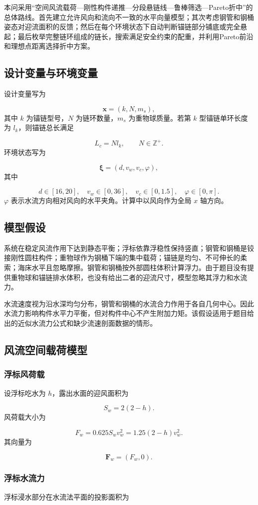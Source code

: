 \documentclass[UTF8,zihao=-4,a4paper,fontset=fandol]{ctexart}
\begin{document}
本问采用“空间风流载荷—刚性构件递推—分段悬链线—鲁棒筛选—Pareto折中”的总体路线。首先建立允许风向和流向不一致的水平向量模型；其次考虑钢管和钢桶姿态对迎流面积的反馈；然后在每个环境状态下自动判断锚链部分铺底或完全悬起；最后枚举完整链环组成的链长，搜索满足安全约束的配重，并利用Pareto前沿和理想点距离选择折中方案。

\subsection{设计变量与环境变量}
设计变量写为

\[
\boldsymbol x=(k,N,m_s),
\]
其中 \(k\) 为锚链型号，\(N\) 为链环数量，\(m_s\) 为重物球质量。若第 \(k\) 型锚链单环长度为 \(l_k\)，则锚链总长满足

\[
L_c=Nl_k,\qquad N\in\mathbb Z^+.
\]
环境状态写为

\[
\boldsymbol\xi=(d,v_w,v_c,\varphi),
\]
其中

\[
d\in[16,20],\quad
v_w\in[0,36],\quad
v_c\in[0,1.5],\quad
\varphi\in[0,\pi].
\]
\(\varphi\) 表示水流方向相对风向的水平夹角。计算中以风向作为全局 \(x\) 轴方向。

\subsection{模型假设}
系统在稳定风流作用下达到静态平衡；浮标依靠浮稳性保持竖直；钢管和钢桶是铰接刚性圆柱构件；重物球作为钢桶下端的集中载荷；锚链是均匀、不可伸长的柔索；海床水平且忽略摩擦。钢管和钢桶按外部圆柱体积计算浮力。由于题目没有提供重物球和锚链排水体积，也没有给出二者的迎流尺寸，模型忽略其浮力和水流力。

水流速度视为沿水深均匀分布，钢管和钢桶的水流合力作用于各自几何中心。因此水流力影响构件水平力平衡，但对构件中心不产生附加力矩。该假设适用于题目给出的近似水流力公式和缺少流速剖面数据的情形。

\subsection{风流空间载荷模型}
\subsubsection{浮标风荷载}
设浮标吃水为 \(h\)，露出水面的迎风面积为

\[
S_w=2(2-h).
\]
风荷载大小为

\[
F_w=0.625S_wv_w^2
=1.25(2-h)v_w^2. \tag{1}
\]
其向量为

\[
\boldsymbol F_w=(F_w,0).
\]
\subsubsection{浮标水流力}
浮标浸水部分在水流法平面的投影面积为
\end{document}

